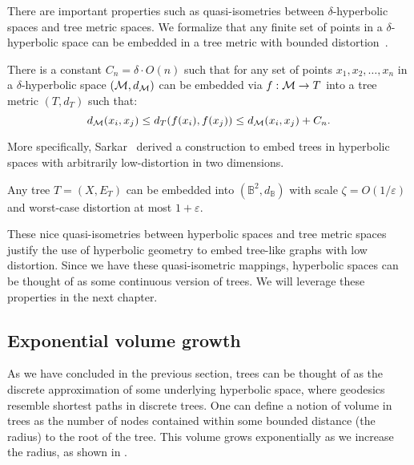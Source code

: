 There are important properties such as quasi-isometries between $\delta$-hyperbolic spaces and tree metric spaces. We formalize that any finite set of points in a $\delta$-hyperbolic space can be embedded in a tree metric with bounded distortion~\cite{gromov1987hyperbolic}.

\begin{proposition}
    There is a constant $C_n =\delta \cdot O(n)$ such that for any set of points $x_1, x_2, \dots,x_n$ in a $\delta$-hyperbolic space $(\mathcal{M},d_{\mathcal{M}})$ can be embedded via $f:\mathcal{M} \to T$ into a tree metric $(T,d_T)$ such that:
    \begin{equation*}
        d_{\mathcal{M}}(x_i, x_j)\leq d_T(f(x_i), f(x_j)) \leq d_{\mathcal{M}}(x_i, x_j) + C_n.
    \end{equation*}
\end{proposition}

More specifically, Sarkar~\cite{sarkar2011lowDIstortionDelaunayEmbedding} derived a construction to embed trees in hyperbolic spaces with arbitrarily low-distortion in two dimensions.

\begin{proposition}[Sarkar]
    Any tree $T=(X,E_T)$ can be embedded into $(\mathbb{B}^2, d_\mathbb{B})$ with scale $\zeta = O(1/\varepsilon)$ and worst-case distortion at most $1 + \varepsilon$.
\end{proposition}

These nice quasi-isometries between hyperbolic spaces and tree metric spaces justify the use of hyperbolic geometry to embed tree-like graphs with low distortion. Since we have these quasi-isometric mappings, hyperbolic spaces can be thought of as some continuous version of trees. We will leverage these properties in the next chapter. 

\subsection{Exponential volume growth}\label{sec:expGrowth}
As we have concluded in the previous section, trees can be thought of as the discrete approximation of some underlying hyperbolic space, where geodesics resemble shortest paths in discrete trees. One can define a notion of volume in trees as the number of nodes contained within some bounded distance (the radius) to the root of the tree. This volume grows exponentially as we increase the radius, as shown in .



